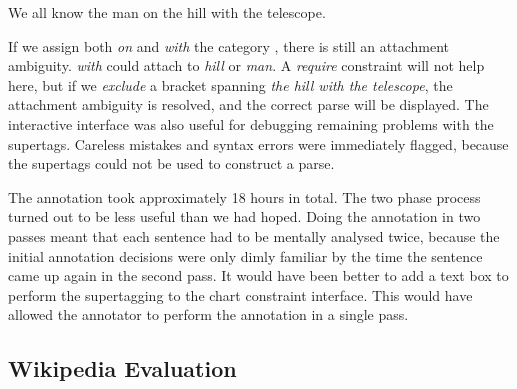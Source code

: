 \begin{lexamples}
 \item We all know the man on the hill with the telescope.
\end{lexamples}

If we assign both \emph{on} and \emph{with} the category ,
there is still an attachment ambiguity. \emph{with} could attach to \emph{hill}
or \emph{man}. A \emph{require} constraint will not help here, but if we
\emph{exclude} a bracket spanning \emph{the hill with the telescope}, the
attachment ambiguity is resolved, and the correct parse will be displayed. The
interactive interface was also useful for debugging remaining problems with the
supertags. Careless mistakes and syntax errors were immediately flagged, because
the supertags could not be used to construct a parse.

The annotation took approximately 18 hours in total. The two phase process
turned out to be less useful than we had hoped. Doing the annotation in two
passes meant that each sentence had to be mentally analysed twice, because the
initial annotation decisions were only dimly familiar by the time the sentence
came up again in the second pass. It would have been better to add a text box to
perform the supertagging to the chart constraint interface. This would have
allowed the annotator to perform the annotation in a single pass.


\subsection{Wikipedia Evaluation}

